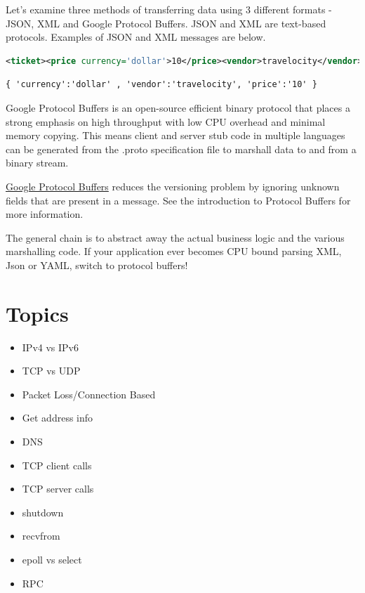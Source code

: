 Let's examine three methods of transferring data using 3 different formats - JSON, XML and Google Protocol Buffers.
JSON and XML are text-based protocols.
Examples of JSON and XML messages are below.

\begin{lstlisting}[language=XML]
<ticket><price currency='dollar'>10</price><vendor>travelocity</vendor></ticket>
\end{lstlisting}

\begin{lstlisting}
{ 'currency':'dollar' , 'vendor':'travelocity', 'price':'10' }
\end{lstlisting}

Google Protocol Buffers is an open-source efficient binary protocol that places a strong emphasis on high throughput with low CPU overhead and minimal memory copying.
This means client and server stub code in multiple languages can be generated from the .proto specification file to marshall data to and from a binary stream.

\href{https://developers.google.com/protocol-buffers/docs/overview}{Google Protocol Buffers} reduces the versioning problem by ignoring unknown fields that are present in a message.
See the introduction to Protocol Buffers for more information.

The general chain is to abstract away the actual business logic and the various marshalling code.
If your application ever becomes CPU bound parsing XML, Json or YAML, switch to protocol buffers!

\section{Topics}

\begin{itemize}
\tightlist
\item
  IPv4 vs IPv6
\item
  TCP vs UDP
\item
  Packet Loss/Connection Based
\item
  Get address info
\item
  DNS
\item
  TCP client calls
\item
  TCP server calls
\item
  shutdown
\item
  recvfrom
\item
  epoll vs select
\item
  RPC
\end{itemize}

